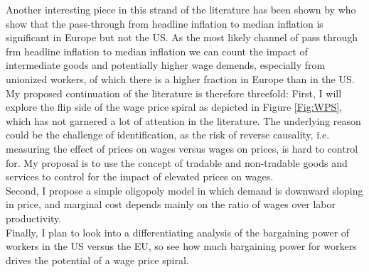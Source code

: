 \documentclass[ProjectDLO]{subfiles}
\begin{document}
Another interesting piece in this strand of the literature has been shown by \cite{BallMazumder} who show that the pass-through from headline inflation to median inflation is significant in Europe but not the US. As the most likely channel of pass through frm headline inflation to median inflation we can count the impact of intermediate goods and potentially higher wage demends, especially from unionized workers, of which there is a higher fraction in Europe than in the US.\\

My proposed continuation of the literature is therefore threefold: First, I will explore the flip side of the wage price spiral as depicted in Figure \ref{Fig:WPS}, which has not garnered a lot of attention in the literature. The underlying reason could be the challenge of identification, as the risk of reverse causality, i.e. measuring the effect of prices on wages versus wages on prices, is hard to control for. My proposal is to use the concept of tradable and non-tradable goods and services to control for the impact of elevated prices on wages.\\
Second, I propose a simple oligopoly model in which demand is downward sloping in price, and marginal cost depends mainly on the ratio of wages over labor productivity.\\
Finally, I plan to look into a differentiating analysis of the bargaining power of workers in the US versus the EU, so see how much bargaining power for workers drives the potential of a wage price spiral.

\label{Fig:WPS}






\hypertarget{PF-Constrained-Solution}{}
\hypertarget{Constrained-Solution}{}




\end{document}
